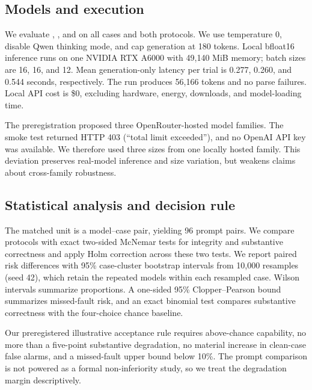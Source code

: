 \subsection{Models and execution}
We evaluate \qwenfour, \qweneight, and \qwenfourteen on all cases and both protocols. We use temperature 0, disable Qwen thinking mode, and cap generation at 180 tokens. Local bfloat16 inference runs on one NVIDIA RTX A6000 with 49,140 MiB memory; batch sizes are 16, 16, and 12. Mean generation-only latency per trial is 0.277, 0.260, and 0.544 seconds, respectively. The run produces 56,166 tokens and no parse failures. Local API cost is \$0, excluding hardware, energy, downloads, and model-loading time.

The preregistration proposed three OpenRouter-hosted model families. The smoke test returned HTTP 403 (``total limit exceeded''), and no OpenAI API key was available. We therefore used three sizes from one locally hosted family. This deviation preserves real-model inference and size variation, but weakens claims about cross-family robustness.

\subsection{Statistical analysis and decision rule}
The matched unit is a model--case pair, yielding 96 prompt pairs. We compare protocols with exact two-sided McNemar tests for integrity and substantive correctness and apply Holm correction across these two tests. We report paired risk differences with 95\% case-cluster bootstrap intervals from 10,000 resamples (seed 42), which retain the repeated models within each resampled case. Wilson intervals summarize proportions. A one-sided 95\% Clopper--Pearson bound summarizes missed-fault risk, and an exact binomial test compares substantive correctness with the four-choice chance baseline.

Our preregistered illustrative acceptance rule requires above-chance capability, no more than a five-point substantive degradation, no material increase in clean-case false alarms, and a missed-fault upper bound below 10\%. The prompt comparison is not powered as a formal non-inferiority study, so we treat the degradation margin descriptively.
